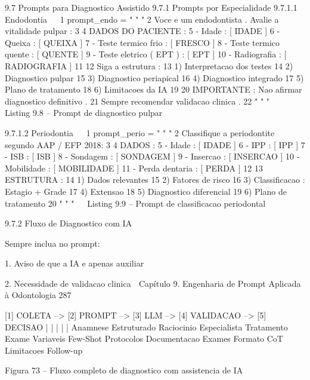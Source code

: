   9.7       Prompts para Diagnostico Assistido
  9.7.1     Prompts por Especialidade
  9.7.1.1   Endodontia
                                                                               
 1 prompt_endo = " " "
 2 Voce e um endodontista . Avalie a vitalidade pulpar :
 3
 4 DADOS DO PACIENTE :
 5 - Idade : [ IDADE ]
 6 - Queixa : [ QUEIXA ]
 7 - Teste termico frio : [ FRESCO ]
 8 - Teste termico quente : [ QUENTE ]
 9 - Teste eletrico ( EPT ) : [ EPT ]
10 - Radiografia : [ RADIOGRAFIA ]
11
12 Siga a estrutura :
13 1) Interpretacao dos testes
14 2) Diagnostico pulpar
15 3) Diagnostico periapical
16 4) Diagnostico integrado
17 5) Plano de tratamento
18 6) Limitacoes da IA
19
20 IMPORTANTE : Nao afirmar diagnostico definitivo .
21 Sempre recomendar validacao clinica .
22 " " "
                                                                               
                          Listing 9.8 – Prompt de diagnostico pulpar


  9.7.1.2   Periodontia
                                                                               
 1 prompt_perio = " " "
 2 Classifique a periodontite segundo AAP / EFP 2018:
 3
 4 DADOS :
 5 - Idade : [ IDADE ]
 6 - IPP : [ IPP ]
 7 - ISB : [ ISB ]
 8 - Sondagem : [ SONDAGEM ]
 9 - Insercao : [ INSERCAO ]
10 - Mobilidade : [ MOBILIDADE ]
11 - Perda dentaria : [ PERDA ]
12
13 ESTRUTURA :
14 1) Dados relevantes
15 2) Fatores de risco
16 3) Classificacao : Estagio + Grade
17 4) Extensao
18 5) Diagnostico diferencial
19 6) Plano de tratamento
20 " " "
                                                                               
                      Listing 9.9 – Prompt de classificacao periodontal


  9.7.2     Fluxo de Diagnostico com IA

     Sempre inclua no prompt:

        1. Aviso de que a IA e apenas auxiliar

        2. Necessidade de validacao clinica
  Capítulo 9. Engenharia de Prompt Aplicada à Odontologia                                   287


  [1] COLETA --> [2] PROMPT --> [3] LLM --> [4] VALIDACAO --> [5] DECISAO
    |              |              |              |              |
  Anamnese    Estruturado    Raciocinio    Especialista    Tratamento
  Exame       Variaveis      Few-Shot      Protocolos      Documentacao
  Exames      Formato        CoT           Limitacoes      Follow-up

             Figura 73 – Fluxo completo de diagnostico com assistencia de IA


